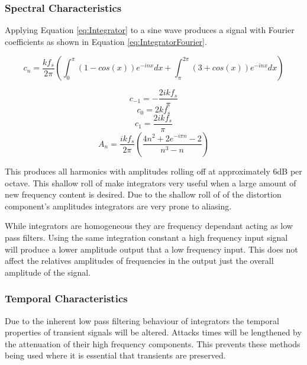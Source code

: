 		\subsubsection*{Spectral Characteristics}
			Applying Equation \ref{eq:Integrator} to a sine wave produces a signal with Fourier coefficients as
			shown in Equation \ref{eq:IntegratorFourier}.

			\[ c_{n} = \frac{kf_{s}}{2\pi} \left( \int_{0}^{\pi} (1 - cos(x))e^{-inx} dx +
							       \int_{\pi}^{2\pi} (3 + cos(x))e^{-inx} dx \right) \]

			\[ c_{-1} = - \frac{2ikf_{s}}{\pi} \]
			\[ c_{0} = 2kf_{s} \]
			\[ c_{1} = \frac{2ikf_{s}}{\pi} \]
			\begin{equation}
				A_{n} = \frac{ikf_{s}}{2\pi} \left( \frac{4n^{2} + 2e^{-i\pi n} - 2}{n^{3} - n} \right)
				\label{eq:IntegratorFourier}
			\end{equation}

			This produces all harmonics with amplitudes rolling off at approximately 6dB per octave. This
			shallow roll of make integrators very useful when a large amount of new frequency content is
			desired. Due to the shallow roll of of the distortion component's amplitudes integrators are very
			prone to aliasing.

			While integrators are homogeneous they are frequency dependant acting as low pass filters. Using
			the same integration constant a high frequency input signal will produce a lower amplitude output
			that a low frequency input. This does not affect the relatives amplitudes of frequencies in the
			output just the overall amplitude of the signal.

		\subsubsection*{Temporal Characteristics}
			Due to the inherent low pass filtering behaviour of integrators the temporal properties of
			transient signals will be altered. Attacks times will be lengthened by the attenuation of their
			high frequency components. This prevents these methods being used where it is essential that
			transients are preserved. 
			

